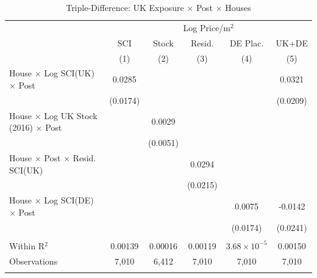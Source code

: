 
\begin{table}[htbp]
   \caption{\label{tab:triple} Triple-Difference: UK Exposure $\times$ Post $\times$ Houses}
   \bigskip
   \centering
   \begin{tabular}{lccccc}
      \toprule
       & \multicolumn{5}{c}{Log Price/m$^2$}\\
                                                         & SCI           & Stock         & Resid.        & DE Plac.              & UK+DE \\   
                                                         & (1)           & (2)           & (3)           & (4)                   & (5)\\  
      \midrule 
      House $\times$ Log SCI(UK) $\times$ Post           & 0.0285        &               &               &                       & 0.0321\\   
                                                         & (0.0174)      &               &               &                       & (0.0209)\\   
      House $\times$ Log UK Stock (2016) $\times$ Post   &               & 0.0029        &               &                       &   \\   
                                                         &               & (0.0051)      &               &                       &   \\   
      House $\times$ Post $\times$ Resid. SCI(UK)        &               &               & 0.0294        &                       &   \\   
                                                         &               &               & (0.0215)      &                       &   \\   
      House $\times$ Log SCI(DE) $\times$ Post           &               &               &               & 0.0075                & -0.0142\\   
                                                         &               &               &               & (0.0174)              & (0.0241)\\   
       \\
      Within R$^2$                                       & 0.00139       & 0.00016       & 0.00119       & $3.68\times 10^{-5}$  & 0.00150\\  
      Observations                                       & 7,010         & 6,412         & 7,010         & 7,010                 & 7,010\\  
       \\

\end{tabular}
\end{table}
